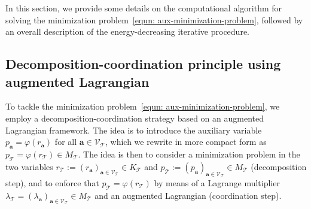 \documentclass[a4paper,11pt]{article}
\theoremstyle{definition}
\theoremstyle{remark}
\numberwithin{equation}{section}
\newcommand{\disr}{r_\calT}
\newcommand{\disp}{p_\calT}
\newcommand{\disK}{K_\calT}
\newcommand{\disM}{M_\calT}
\newcommand{\disLamb}{\lambda_\calT}
\newcommand{\ba}{{\boldsymbol a}}
\newcommand{\calT}{\mathcal{T}}
\newcommand{\calV}{\mathcal{V}}
\newcommand{\vertex}{\calV_\calT}
\begin{document}
In this section, we provide some details on the computational algorithm for solving
the minimization problem~\eqref{equn: aux-minimization-problem}, followed by an
overall description of the energy-decreasing iterative procedure. 

\subsection{Decomposition-coordination principle using augmented Lagrangian}

To tackle the minimization problem~\eqref{equn: aux-minimization-problem}, we 
employ a decomposition-coordination strategy based on an augmented Lagrangian framework.
The idea is to introduce the auxiliary variable $p_{\ba}=\varphi(r_\ba)$ 
for all $\ba\in\vertex$, which we rewrite in more compact form as 
$\disp=\varphi(\disr)\in \disM$. The idea is then to consider a minimization problem
in the two variables $\disr:=(r_\ba)_{\ba\in\vertex}\in \disK $ and 
$\disp:=(p_\ba)_{\ba\in\vertex}\in \disM$ (decomposition step), 
and to enforce that $\disp=\varphi(\disr)$
by means of a Lagrange multiplier $\disLamb=(\lambda_\ba)_{\ba\in\vertex}\in \disM$
and an augmented Lagrangian (coordination step). 
\end{document}
